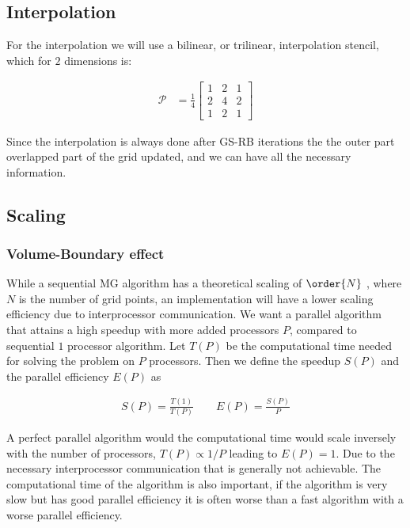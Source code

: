 	\subsection{Interpolation}
		For the interpolation we will use a bilinear, or trilinear, interpolation stencil,
		which for \(2\) dimensions is:

		\begin{align}
			\mathcal{P} &= \frac{1}{4}
			\begin{bmatrix}
				1 & 2 & 1
				\\
				2 & 4 & 2
				\\
				1 & 2 & 1
			\end{bmatrix}
		\end{align}

		Since the interpolation is always done after GS-RB iterations the the outer
		part overlapped part of the grid updated, and we can have all the necessary
		information.




	\subsection{Scaling}
		\subsubsection{Volume-Boundary effect}
		While a sequential MG algorithm has a theoretical scaling of \(\order{N}\)
		\citep{press_numerical_1988}, where \(N\) is the number of grid points, an
		implementation will have a lower scaling efficiency due to interprocessor
		communication. We want a parallel algorithm that attains a high speedup with
		more added processors \(P\),  compared to sequential \(1\) processor algorithm.
		Let \(T(P)\) be the computational time needed for solving the problem on \(P\)
		processors. Then we define the speedup \(S(P)\) and the parallel efficiency \(E(P)\) as

		\begin{align}
			S(P) = \frac{T(1)}{T(P)} \qquad E(P) = \frac{S(P)}{P}
		\end{align}

		A perfect parallel algorithm would the computational time would scale inversely
		with the number of processors, \(T(P) \propto 1/P\) leading to \( E(P) =1 \).
		Due to the necessary interprocessor communication that is generally not
		achievable. The computational time of the algorithm is also important, if
		the algorithm is very slow but has good parallel efficiency it is often
		worse than a fast algorithm with a worse parallel efficiency.

